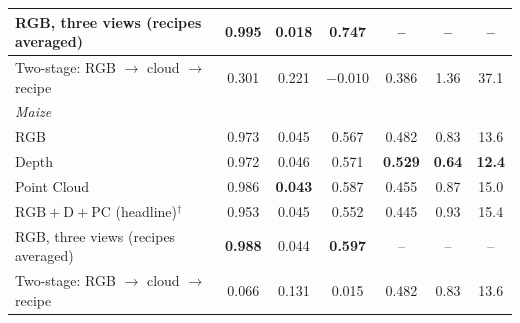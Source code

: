 \documentclass[10pt,twocolumn,letterpaper]{article}
\begin{document}
\begin{table}[t]
\begin{tabular}{l cc c ccc}
    RGB, three views (recipes averaged) & 0.995 & \textbf{0.018} & \textbf{0.747} & -- & -- & -- \\
    \midrule
    Two-stage: RGB $\to$ cloud $\to$ recipe & 0.301 & 0.221 & $-0.010$ & 0.386 & 1.36 & 37.1 \\
    \midrule
    \multicolumn{7}{l}{\emph{Maize}} \\
    RGB & 0.973 & 0.045 & 0.567 & 0.482 & 0.83 & 13.6 \\
    Depth & 0.972 & 0.046 & 0.571 & \textbf{0.529} & \textbf{0.64} & \textbf{12.4} \\
    Point Cloud & 0.986 & \textbf{0.043} & 0.587 & 0.455 & 0.87 & 15.0 \\
    $\mathrm{RGB}+\mathrm{D}+\mathrm{PC}$ (headline)$^\dagger$ & 0.953 & 0.045 & 0.552 & 0.445 & 0.93 & 15.4 \\
    RGB, three views (recipes averaged) & \textbf{0.988} & 0.044 & \textbf{0.597} & -- & -- & -- \\
    \midrule
    Two-stage: RGB $\to$ cloud $\to$ recipe & 0.066 & 0.131 & 0.015 & 0.482 & 0.83 & 13.6 \\
    \bottomrule
  \end{tabular}
\end{table}
\end{document}
